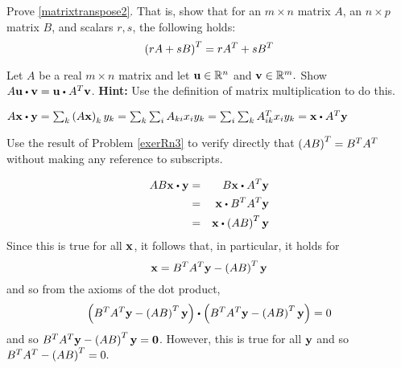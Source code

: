 \begin{enumialphparenastyle}
\begin{ex} Prove \ref{matrixtranspose2}. That is, show that for an $m \times n$ matrix $A$, an $n \times p$ matrix $B$, and scalars $r, s$, the following holds:
\[
\left(rA + sB \right) ^T = rA^{T} + sB^{T}
\]
\end{ex}

\begin{ex} \label{exerRn3}  Let $A$ be a real $m\times n$ matrix and
let ${\bf u}\in \mathbb{R}^{n}$ and ${\bf v}\in \mathbb{R}^{m}.$ Show 
$A\vect{u}\dotprod \vect{v}=\vect{u}\dotprod A^{T}\vect{v}$. 
\textbf{Hint:} Use the definition of matrix
multiplication to do this.
\begin{sol}
$A\vect{x}\dotprod \vect{y}=\sum_{k}\tup{A\vect{x}
} _{k}y_{k}=\sum_{k}\sum_{i}A_{ki}x_{i}y_{k}=\sum_{i}
\sum_{k}A_{ik}^{T}x_{i}y_{k}= \vect{x} \dotprod A^{T}\vect{y} $
\end{sol}
\end{ex}

\begin{ex} Use the result of Problem \ref{exerRn3} to verify directly
that $\left(AB\right) ^{T}=B^{T}A^{T}$ without making any reference to
subscripts.
\begin{sol}
\begin{eqnarray*}
 AB\vect{x} \dotprod \vect{y} &=& B\vect{x} \dotprod A^{T}\vect{y} \\ 
&=& \vect{x}\dotprod B^{T}A^{T}\vect{y} \\
&=& \vect{x}\dotprod \tup{AB} ^{T} \vect{y}
\end{eqnarray*}
Since this is true for all ${\bf x}$, it follows that, in particular, it
holds for
\[
{\bf x}=B^{T}A^{T}{\bf y}-\left(AB\right) ^{T}{\bf y}
\]
and so from the axioms of the dot product,
\[
\tup{B^{T}A^{T}\vect{y}-\tup{AB} ^{T}\vect{y}} \dotprod \tup{B^{T}A^{T}
\vect{y}-\tup{AB} ^{T}\vect{y}} =0
\]
and so $B^{T}A^{T}{\bf y}-\left(AB\right) ^{T}{\bf y}={\bf 0}$. However,
this is true for all ${\bf y}$ and so $B^{T}A^{T}-\left(
AB\right) ^{T}=0.$
\end{sol}
\end{ex}
 
\end{enumialphparenastyle}